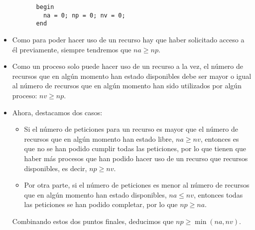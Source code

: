\begin{ejercicio*}
\begin{verbatim}
          begin
            na = 0; np = 0; nv = 0;
          end
    \end{verbatim}
    \begin{itemize}
        \item Como para poder hacer uso de un recurso hay que haber solicitado acceso a él previamente, siempre tendremos que $na \geq np$.
        \item Como un proceso solo puede hacer uso de un recurso a la vez, el número de recursos que en algún momento han estado disponibles debe ser mayor o igual al número de recursos que en algún momento han sido utilizados por algún proceso: $nv \geq np$.
        \item Ahora, destacamos dos casos:
            \begin{itemize}
                \item Si el número de peticiones para un recurso es mayor que el número de recursos que en algún momento han estado libre, $na \geq nv$, entonces es que no se han podido cumplir todas las peticiones, por lo que tienen que haber más procesos que han podido hacer uso de un recurso que recursos disponibles, es decir, $np \geq nv$.
                \item Por otra parte, si el número de peticiones es menor al número de recursos que en algún momento han estado disponibles, $na \leq nv$, entonces todas las peticiones se han podido completar, por lo que $np \geq na$.
            \end{itemize}
            Combinando estos dos puntos finales, deducimos que $np \geq \min(na, nv)$.
    \end{itemize}

\end{ejercicio*}
